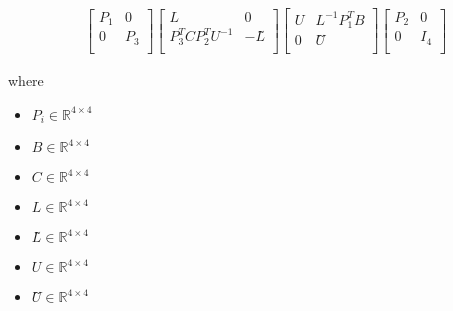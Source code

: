 \documentclass[12pt]{article}
\begin{document}
\begin{align*}
 & \begin{bmatrix}
\textit{P}_{ 1 } & 0\\
0 & \textit{P}_{ 3 }\\
\end{bmatrix}\begin{bmatrix}
\textit{L} & 0\\
\textit{P}_{ 3 }^T\textit{C}\textit{P}_{ 2 }^T\textit{U}^{-1} & -\textit{L̃}\\
\end{bmatrix}\begin{bmatrix}
\textit{U} & \textit{L}^{-1}\textit{P}_{ 1 }^T\textit{B}\\
0 & \textit{Ũ}\\
\end{bmatrix}\begin{bmatrix}
\textit{P}_{ 2 } & 0\\
0 & I_{ 4 }\\
\end{bmatrix}
\end{align*}

where
\begin{itemize}
\item $\textit{P}_{\textit{i}} \in \mathbb{R}^{ 4 \times 4 }$
\item $\textit{B} \in \mathbb{R}^{ 4 \times 4 }$
\item $\textit{C} \in \mathbb{R}^{ 4 \times 4 }$
\item $\textit{L} \in \mathbb{R}^{ 4 \times 4 }$
\item $\textit{L̃} \in \mathbb{R}^{ 4 \times 4 }$
\item $\textit{U} \in \mathbb{R}^{ 4 \times 4 }$
\item $\textit{Ũ} \in \mathbb{R}^{ 4 \times 4 }$
\end{itemize}
\end{document}
